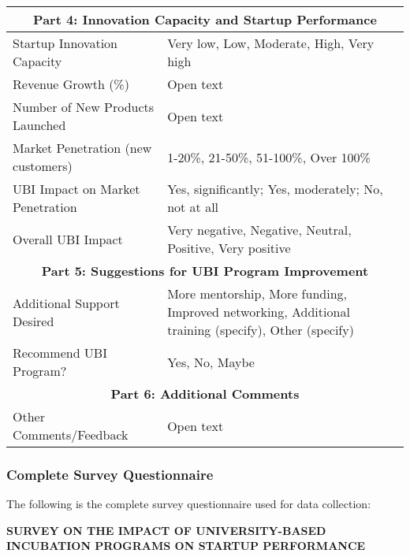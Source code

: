 \documentclass[../Main.tex]{subfiles}%
\begin{document}
\begin{longtable}{|p{4cm}|p{8cm}|p{3cm}|}
	\hline
	\multicolumn{3}{|c|}{\textbf{Part 4: Innovation Capacity and Startup Performance}} \\
	\hline
	Startup Innovation Capacity & Very low, Low, Moderate, High, Very high & \\
	\cline{1-2}
	Revenue Growth (\%) & Open text & \\
	\cline{1-2}
	Number of New Products Launched & Open text & \\
	\cline{1-2}
	Market Penetration (new customers) & 1-20\%, 21-50\%, 51-100\%, Over 100\% & \\
	\cline{1-2}
	UBI Impact on Market Penetration & Yes, significantly; Yes, moderately; No, not at all & \\
	\cline{1-2}
	Overall UBI Impact & Very negative, Negative, Neutral, Positive, Very positive & \\
	\hline
	\multicolumn{3}{|c|}{\textbf{Part 5: Suggestions for UBI Program Improvement}} \\
	\hline
	Additional Support Desired & More mentorship, More funding, Improved networking, Additional training (specify), Other (specify) & \\
	\cline{1-2}
	Recommend UBI Program? & Yes, No, Maybe & \\
	\hline
	\multicolumn{3}{|c|}{\textbf{Part 6: Additional Comments}} \\
	\hline
	Other Comments/Feedback & Open text & \\
	\hline
	\end{longtable}

	\subsubsection{Complete Survey Questionnaire}
	The following is the complete survey questionnaire used for data collection:
	
	\begin{center}
	\textbf{SURVEY ON THE IMPACT OF UNIVERSITY-BASED INCUBATION PROGRAMS ON STARTUP PERFORMANCE}
	\end{center}
	
\end{document}
